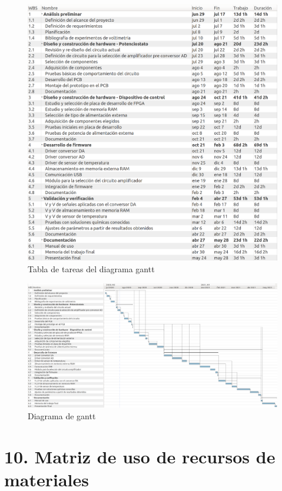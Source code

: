 \documentclass[11pt]{charter}
\begin{document}
\begin{figure}[H]
\centering 
\includegraphics[width=1\textwidth]{./Figuras/tabla_gantt.png}
\caption{Tabla de tareas del diagrama gantt}
\label{fig:gantt_tabla}
\end{figure}
\begin{landscape}
\begin{figure}[H]
\centering 
\includegraphics[width=1.6\textwidth]{./Figuras/gantt_full.png}
\caption{Diagrama de gantt}
\label{fig:gantt}
\end{figure}

\end{landscape}

\section{10. Matriz de uso de recursos de materiales}
\label{sec:recursos}
\end{document}
